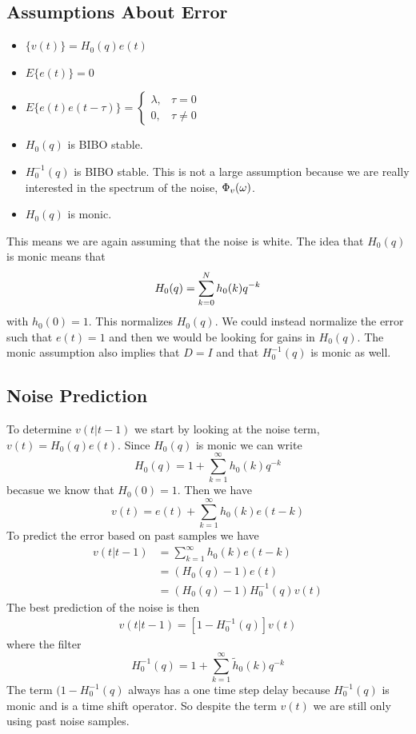 \subsection{Assumptions About Error}
\begin{itemize}
\item $\{v(t)\} = H_0(q)e(t)$
\item $E\{e(t)\} = 0$
\item $E\{e(t)e(t-\tau)\} = \begin{cases} \lambda, & \tau=0 \\ 0, & \tau\neq0 \end{cases}$
\item $H_0(q)$ is BIBO stable.
\item $H_0^{-1}(q)$ is BIBO stable. This is not a large assumption because we are really interested in the spectrum of the noise, $\Phi_v(\omega)$.
\item $H_0(q)$ is monic.
\end{itemize}
This means we are again assuming that the noise is white. The idea that $H_0(q)$ is monic means that
$$H_0(q)=\sum_{k=0}^N h_0(k)q^{-k}$$
with $h_0(0)=1$. This normalizes $H_0(q)$. We could instead normalize the error such that $e(t)=1$ and then we would be looking for gains in $H_0(q)$. The monic assumption also implies that $D=I$ and that $H_0^{-1}(q)$ is monic as well.

\subsection{Noise Prediction}
To determine $v(t|t-1)$ we start by looking at the noise term, $v(t)=H_0(q)e(t)$. Since $H_0(q)$ is monic we can write
$$H_0(q) = 1 + \sum_{k=1}^\infty h_0(k)q^{-k}$$
becasue we know that $H_0(0) = 1$. Then we have
$$v(t) = e(t) + \sum_{k=1}^\infty h_0(k)e(t-k)$$
To predict the error based on past samples we have
\begin{align*}
v(t|t-1) &= \sum_{k=1}^\infty h_0(k)e(t-k) \\
&= (H_0(q)-1)e(t) \\
&= (H_0(q)-1)H_0^{-1}(q)v(t)
\end{align*}
The best prediction of the noise is then
\begin{align}
\label{eq:noise}
\boxed{v(t|t-1) = [1-H_0^{-1}(q)]v(t)}
\end{align}
where the filter
$$H_0^{-1}(q) = 1+\sum_{k=1}^\infty \tilde{h}_0(k)q^{-k}$$
The term $(1-H_0^{-1}(q)$ always has a one time step delay because $H_0^{-1}(q)$ is monic and is a time shift operator. So despite the term $v(t)$ we are still only using past noise samples.

